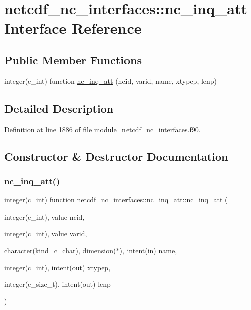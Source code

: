 \hypertarget{interfacenetcdf__nc__interfaces_1_1nc__inq__att}{}\section{netcdf\+\_\+nc\+\_\+interfaces\+:\+:nc\+\_\+inq\+\_\+att Interface Reference}
\label{interfacenetcdf__nc__interfaces_1_1nc__inq__att}
\subsection*{Public Member Functions}
\begin{DoxyCompactItemize}
\item 
integer(c\+\_\+int) function \hyperlink{interfacenetcdf__nc__interfaces_1_1nc__inq__att_a041aef64e0878e06b2528aabd20736e1}{nc\+\_\+inq\+\_\+att} (ncid, varid, name, xtypep, lenp)
\end{DoxyCompactItemize}


\subsection{Detailed Description}


Definition at line 1886 of file module\+\_\+netcdf\+\_\+nc\+\_\+interfaces.\+f90.



\subsection{Constructor \& Destructor Documentation}
\mbox{\label{interfacenetcdf__nc__interfaces_1_1nc__inq__att_a041aef64e0878e06b2528aabd20736e1}} 
\subsubsection{\texorpdfstring{nc\+\_\+inq\+\_\+att()}{nc\_inq\_att()}}
{\footnotesize\ttfamily integer(c\+\_\+int) function netcdf\+\_\+nc\+\_\+interfaces\+::nc\+\_\+inq\+\_\+att\+::nc\+\_\+inq\+\_\+att (\begin{DoxyParamCaption}\item[{integer(c\+\_\+int), value}]{ncid,  }\item[{integer(c\+\_\+int), value}]{varid,  }\item[{character(kind=c\+\_\+char), dimension($\ast$), intent(in)}]{name,  }\item[{integer(c\+\_\+int), intent(out)}]{xtypep,  }\item[{integer(c\+\_\+size\+\_\+t), intent(out)}]{lenp }\end{DoxyParamCaption})}



